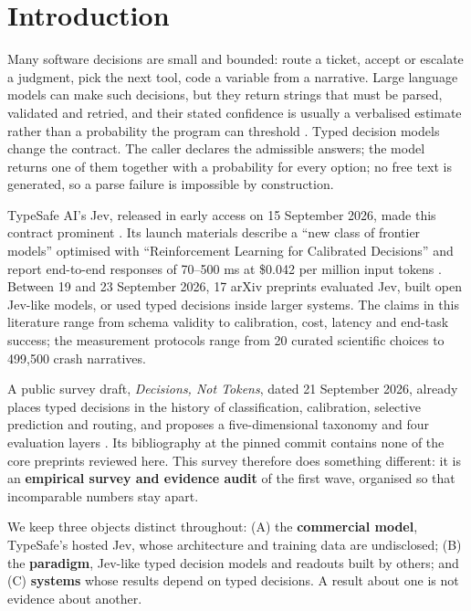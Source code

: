 \section{Introduction}\label{sec:introduction}

Many software decisions are small and bounded: route a ticket, accept or escalate a judgment, pick the next tool, code a variable from a narrative. Large language models can make such decisions, but they return strings that must be parsed, validated and retried, and their stated confidence is usually a verbalised estimate rather than a probability the program can threshold \citep{arxiv2207_05221,arxiv2503_15850}. Typed decision models change the contract. The caller declares the admissible answers; the model returns one of them together with a probability for every option; no free text is generated, so a parse failure is impossible by construction.

TypeSafe AI's Jev, released in early access on 15 September 2026, made this contract prominent \citep{typesafe2026launch}. Its launch materials describe a “new class of frontier models” optimised with “Reinforcement Learning for Calibrated Decisions” and report end-to-end responses of 70–500 ms at \$0.042 per million input tokens \citep{typesafe2026launch,typesafe2026models}. Between 19 and 23 September 2026, 17 arXiv preprints evaluated Jev, built open Jev-like models, or used typed decisions inside larger systems. The claims in this literature range from schema validity to calibration, cost, latency and end-task success; the measurement protocols range from 20 curated scientific choices to 499,500 crash narratives.

A public survey draft, \emph{Decisions, Not Tokens}, dated 21 September 2026, already places typed decisions in the history of classification, calibration, selective prediction and routing, and proposes a five-dimensional taxonomy and four evaluation layers \citep{decisionsnottokens2026}. Its bibliography at the pinned commit contains none of the core preprints reviewed here. This survey therefore does something different: it is an \textbf{empirical survey and evidence audit} of the first wave, organised so that incomparable numbers stay apart.

We keep three objects distinct throughout: (A) the \textbf{commercial model}, TypeSafe's hosted Jev, whose architecture and training data are undisclosed; (B) the \textbf{paradigm}, Jev-like typed decision models and readouts built by others; and (C) \textbf{systems} whose results depend on typed decisions. A result about one is not evidence about another.

